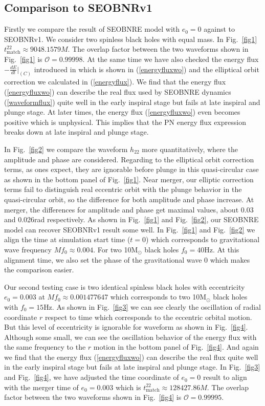 \documentclass[prd,aps,a4paper,superscriptaddress,twocolumn,footinbib,showpacs]{revtex4}
\begin{document}
\subsection{Comparison to SEOBNRv1}
Firstly we compare the result of SEOBNRE model with $e_0=0$ against to SEOBNRv1. We consider two spinless black holes with equal mass. In Fig.~\ref{fig1} $t^{22}_{\text{match}}\approx9048.1579M$. The overlap factor between the two waveforms shown in Fig.~\ref{fig1} is $\mathcal{O}=0.99998$. At the same time we have also checked the energy flux $-\frac{dE}{dt}|_{(C)}$ introduced in \cite{PhysRevD.95.024038} which is shown in (\ref{energyfluxwo}) and the elliptical orbit correction we calculated in (\ref{energyflux}). We find that the energy flux (\ref{energyfluxwo}) can describe the real flux used by SEOBNRE dynamics (\ref{waveformflux}) quite well in the early inspiral stage but fails at late inspiral and plunge stage. At later times, the energy flux (\ref{energyfluxwo}) even becomes positive which is unphysical. This implies that the PN energy flux expression breaks down at late inspiral and plunge stage.

In Fig.~\ref{fig2} we compare the waveform $h_{22}$ more quantitatively, where the amplitude and phase are considered. Regarding to the elliptical orbit correction terms, as ones expect, they are ignorable before plunge in this quasi-circular case as shown in the bottom panel of Fig.~\ref{fig1}. Near merger, our elliptic correction terms fail to distinguish real eccentric orbit with the plunge behavior in the quasi-circular orbit, so the difference for both amplitude and phase increase. At merger, the differences for amplitude and phase get maximal values, about 0.03 and 0.026rad respectively. As shown in Fig.~\ref{fig1} and Fig.~\ref{fig2}, our SEOBNRE model can recover SEOBNRv1 result some well. In Fig.~\ref{fig1} and Fig.~\ref{fig2} we align the time at simulation start time ($t=0$) which corresponds to gravitational wave frequency $Mf_0\approx0.004$. For two 10M${}_\odot$ black holes $f_0=40$Hz. At this alignment time, we also set the phase of the gravitational wave 0 which makes the comparison easier.

Our second testing case is two identical spinless black holes with eccentricity $e_0=0.003$ at $Mf_0\approx0.001477647$ which corresponds to two 10M${}_\odot$ black holes with $f_0=15$Hz. As shown in Fig.~\ref{fig3} we can see clearly the oscillation of radial coordinate $r$ respect to time which corresponds to the eccentric orbital motion. But this level of eccentricity is ignorable for waveform as shown in Fig.~\ref{fig4}. Although some small, we can see the oscillation behavior of the energy flux with the same frequency to the $r$ motion in the bottom panel of Fig.~\ref{fig4}. And again we find that the energy flux (\ref{energyfluxwo}) can describe the real flux quite well in the early inspiral stage but fails at late inspiral and plunge stage. In Fig.~\ref{fig3} and Fig.~\ref{fig4}, we have adjusted the time coordinate of $e_0=0$ result to align with the merger time of $e_0=0.003$ which is $t^{22}_{\text{match}}\approx128427.86M$.
The overlap factor between the two waveforms shown in Fig.~\ref{fig4} is $\mathcal{O}=0.99995$.
\end{document}
